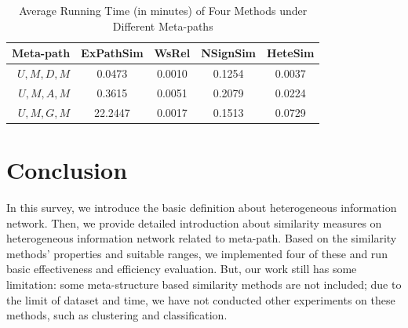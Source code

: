 \documentclass{acm_proc_article-csis8101}
\begin{document}
\begin{table}
\centering
\caption{Average Running Time (in minutes) of Four Methods under Different Meta-paths} 
\label{tab:efficiency}
\begin{tabular}{|r|c|c|c|c|} \hline
Meta-path & ExPathSim & WsRel & NSignSim & HeteSim \\ \hline
$U,M,D,M$ & 0.0473 & 0.0010 & 0.1254 & 0.0037 \\ \hline
$U,M,A,M$ & 0.3615 & 0.0051 & 0.2079 & 0.0224 \\ \hline
$U,M,G,M$ & 22.2447 & 0.0017 & 0.1513 & 0.0729 \\ \hline
\end{tabular}
\end{table}

\section{Conclusion}

In this survey, we introduce the basic definition about heterogeneous information network. Then, we provide detailed introduction about similarity measures on heterogeneous information network related to meta-path. Based on the similarity methods' properties and suitable ranges, we implemented four of these and run basic effectiveness and efficiency evaluation. But, our work still has some limitation: some meta-structure based similarity methods \cite{huang2016meta} are not included; due to the limit of  dataset and time, we have not conducted other experiments on these methods, such as clustering and classification.
\end{document}
